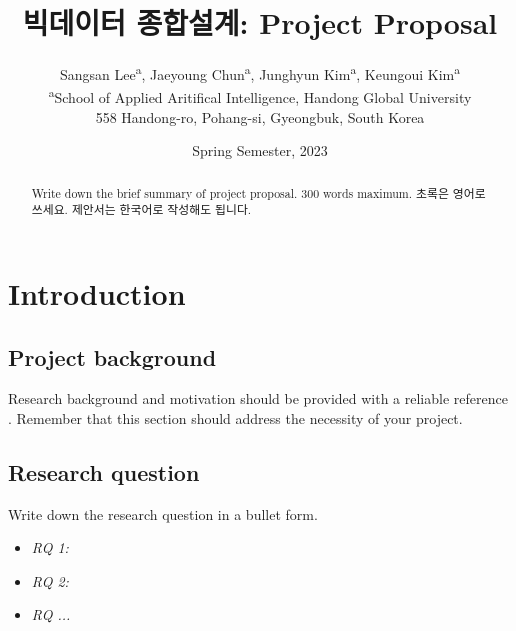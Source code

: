 \documentclass[11pt]{article}
\begin{document}
           

    \title{빅데이터 종합설계: Project Proposal}          
    \author{Sangsan Lee\textsuperscript{a},
        Jaeyoung Chun\textsuperscript{a},
        Junghyun Kim\textsuperscript{a},
        Keungoui Kim\textsuperscript{a}\\
    {\small \textsuperscript{a}School of Applied Aritifical Intelligence, Handong Global University}\\
    {\small 558 Handong-ro, Pohang-si, Gyeongbuk, South Korea}\\
        }

    \date{Spring Semester, 2023}      

    \maketitle                 
 
    \begin{abstract}
        Write down the brief summary of project proposal.
        300 words maximum. 초록은 영어로 쓰세요. 제안서는
        한국어로 작성해도 됩니다.
    \end{abstract}

    \tableofcontents
    \newpage
    
    \section{Introduction} 
    \subsection{Project background}
    Research background and motivation should be provided
    with a reliable reference \citep{Kim2018f, Kim2022}.    
    Remember that this section should address the 
    necessity of your project. 
    
    \subsection{Research question}
    Write down the research question in a bullet form.

    \begin{itemize}
        \item \emph{RQ 1: ~~}
        \item \emph{RQ 2: ~~}
        \item \emph{RQ ...}
    \end{itemize}
\end{document}
